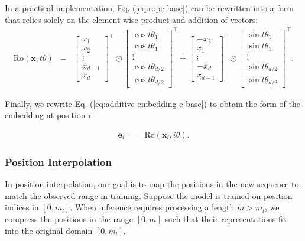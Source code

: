 In a practical implementation, Eq. (\ref{eq:rope-base}) can be rewritten into a form that relies solely on the element-wise product and addition of vectors:
\begin{eqnarray}
\mathrm{Ro}(\mathbf{x},t\theta) & = & \begin{bmatrix} x_1 \\ x_2 \\ \vdots \\ x_{d-1} \\ x_{d} \end{bmatrix}^\top \odot \begin{bmatrix} \cos t\theta_1 \\ \cos t\theta_1 \\ \vdots \\ \cos t\theta_{d/2} \\ \cos t\theta_{d/2} \end{bmatrix}^\top + \begin{bmatrix} -x_2 \\ x_1 \\ \vdots \\ -x_{d} \\ x_{d-1} \end{bmatrix}^\top \odot \begin{bmatrix} \sin t\theta_1 \\ \sin t\theta_1 \\ \vdots \\ \sin t\theta_{d/2} \\ \sin t\theta_{d/2} \end{bmatrix}^\top \label{eq:rope-simple}.
\end{eqnarray}

Finally, we rewrite Eq. (\ref{eq:additive-embedding-e-base}) to obtain the form of the embedding at position $i$

\begin{eqnarray}
\mathbf{e}_i & = & \mathrm{Ro}(\mathbf{x}_i,i\theta).
\end{eqnarray}

\subsubsection{Position Interpolation}

\noindent In position interpolation, our goal is to map the positions in the new sequence to match the observed range in training. Suppose the model is trained on position indices in $[0, m_l]$. When inference requires processing a length $m > m_l$, we compress the positions in the range $[0,m]$ such that their representations fit into the original domain $[0,m_l]$.


